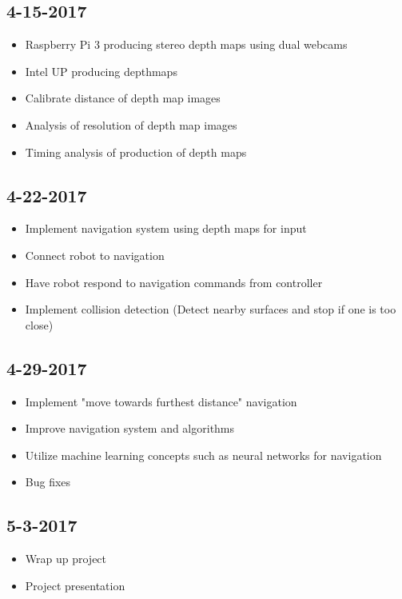\documentclass[11pt]{amsart}
\begin{document}
\subsection*{4-15-2017}
\begin{itemize}
\item Raspberry Pi 3 producing stereo depth maps using dual webcams
\item Intel UP producing depthmaps
\item Calibrate distance of depth map images
\item Analysis of resolution of depth map images
\item Timing analysis of production of depth maps
\end{itemize}

\subsection*{4-22-2017}
\begin{itemize}
\item Implement navigation system using depth maps for input
\item Connect robot to navigation
\item Have robot respond to navigation commands from controller
\item Implement collision detection (Detect nearby surfaces and stop if one is too close)
\end{itemize}

\subsection*{4-29-2017}
\begin{itemize}
\item Implement "move towards furthest distance" navigation
\item Improve navigation system and algorithms
\item Utilize machine learning concepts such as neural networks for navigation
\item Bug fixes
\end{itemize}

\subsection*{5-3-2017}
\begin{itemize}
\item Wrap up project
\item Project presentation
\end{itemize}
\end{document}

